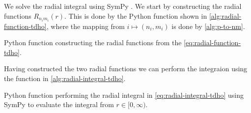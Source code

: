             We solve the radial integral using SymPy \cite{sympy}.
            We start by constructing the radial functions $R_{n_i m_i}(r)$.
            This is done by the Python function shown in
            \autoref{alg:radial-function-tdho}, where the mapping from $i
            \mapsto (n_i, m_i)$ is done by \autoref{alg:p-to-nm}.
            \begin{algorithm}
                \caption{Python function constructing the radial functions from
                the \autoref{eq:radial-function-tdho}.}
                \label{alg:radial-function-tdho}
            \end{algorithm}
            Having constructed the two radial functions we can perform the
            integraion using the function in \autoref{alg:radial-integral-tdho}.
            \begin{algorithm}
                \caption{Python function performing the radial integral in
                \autoref{eq:radial-integral-tdho} using SymPy \cite{sympy} to
                evaluate the integral from $r \in [0, \infty)$.}
                \label{alg:radial-integral-tdho}
            \end{algorithm}

